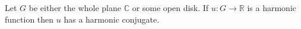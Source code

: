Let $G$ be either the whole plane $\mathbb{C}$ or some open disk. If $u: G \to \mathbb{R}$ is a harmonic function then $u$ has a harmonic conjugate.
